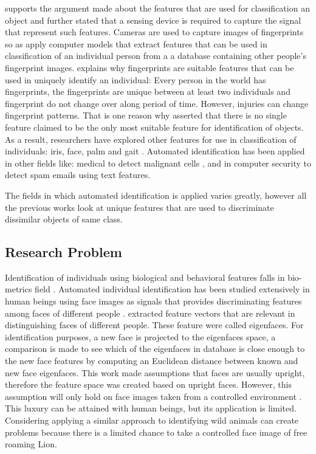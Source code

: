  \citeauthor{duda2012pattern} \citeyear{duda2012pattern} \cite{duda2012pattern} supports the argument made about the features that are used for classification an object and further stated that a sensing device is required to capture the signal that represent such features. Cameras are used to capture images of fingerprints so as apply computer models that extract features that can be used in classification of an individual person from a a database containing other people's fingerprint images. \citeauthor{maltoni2009handbook} \citeyear{maltoni2009handbook} \cite{maltoni2009handbook} explains why fingerprints are suitable features that can be used in uniquely identify an individual: Every person in the world has fingerprints, the fingerprints are unique between at least two individuals and fingerprint do not change over along period of time. However, injuries can change fingerprint patterns. That is one reason why \citeauthor{jain2004introduction} \citeyear{jain2004introduction} \cite{jain2004introduction} asserted that there is no single feature claimed to be the only most suitable feature for identification of objects. As a result, researchers have explored other features for use in classification of individuals: iris, face, palm and gait \cite{jain2007handbook}.     
 Automated identification has been applied in other fields like: medical to detect malignant cells \cite{khan2019novel}, and in computer security to detect spam emails \cite{faris2019intelligent} using text features.
 
The fields in which automated identification is applied varies greatly, however all the previous works look at unique features that are used to discriminate dissimilar objects of same class.    

\subsection{Research Problem} 

Identification of individuals using biological and behavioral features falls in bio-metrics field \cite{jain2004introduction}. Automated individual identification has been studied extensively in human beings using face images as signals that provides discriminating features among faces of different people \cite{turk1991face}. \citeauthor{turk1991face}  \citeyear{turk1991face} \cite{turk1991face} extracted feature vectors that are relevant in distinguishing faces of different people. These feature were called eigenfaces. For identification purposes, a new face is projected to the eigenfaces space, a comparison is made to see which of the eigenfaces in database is close enough to the new face features by computing an Euclidean distance between known and new face eigenfaces. This work made assumptions that faces are usually upright, therefore the feature space was created based on upright faces. However, this assumption will only hold on face images taken from a controlled environment \cite{huang2008labeled}. This luxury can be attained with human beings, but its application is limited. Considering applying a similar approach to identifying wild animals can create problems because there is a limited chance to take a controlled face image of free roaming Lion.      

